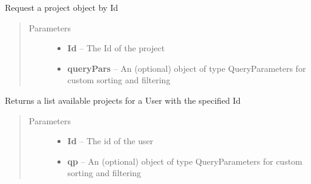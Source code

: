 \documentclass[letterpaper,10pt,english]{sphinxmanual}
\begin{document}
\begin{fulllineitems}
\begin{fulllineitems}
\end{fulllineitems}


\begin{fulllineitems}
\label{Available modules:BaseSpacePy.api.BaseSpaceAPI.BaseSpaceAPI.getProjectById}
Request a project object by Id
\begin{quote}\begin{description}
\item[{Parameters}] \leavevmode\begin{itemize}
\item {} 
\textbf{Id} -- The Id of the project

\item {} 
\textbf{queryPars} -- An (optional) object of type QueryParameters for custom sorting and filtering

\end{itemize}

\end{description}\end{quote}

\end{fulllineitems}


\begin{fulllineitems}
\label{Available modules:BaseSpacePy.api.BaseSpaceAPI.BaseSpaceAPI.getProjectByUser}
Returns a list available projects for a User with the specified Id
\begin{quote}\begin{description}
\item[{Parameters}] \leavevmode\begin{itemize}
\item {} 
\textbf{Id} -- The id of the user

\item {} 
\textbf{qp} -- An (optional) object of type QueryParameters for custom sorting and filtering

\end{itemize}

\end{description}\end{quote}


\end{fulllineitems}
\end{fulllineitems}
\end{document}
